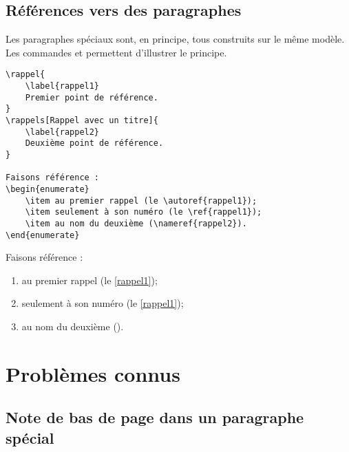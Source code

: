 \newpage





\subsection{Références vers des paragraphes}

Les paragraphes spéciaux sont, en principe, tous construits sur le même modèle. Les commandes \texttt{\rappel} et \texttt{\rappels} permettent d'illustrer le principe.

\begin{minipage}{.65\linewidth}
	\begin{verbatim}
\rappel{
    \label{rappel1}
    Premier point de référence.
}
\rappels[Rappel avec un titre]{
    \label{rappel2}
    Deuxième point de référence.
}

Faisons référence :
\begin{enumerate}
    \item au premier rappel (le \autoref{rappel1});
    \item seulement à son numéro (le \ref{rappel1});
    \item au nom du deuxième (\nameref{rappel2}).
\end{enumerate}
	\end{verbatim}
\end{minipage}
\hfill
\begin{boxedminipage}{.34\linewidth}
	
	Faisons référence :
	\begin{enumerate}
		\item au premier rappel (le \autoref{rappel1});
		\item seulement à son numéro (le \ref{rappel1});
		\item au nom du deuxième ().
	\end{enumerate}
\end{boxedminipage}





\section{Problèmes connus}



\subsection{Note de bas de page dans un paragraphe spécial}

